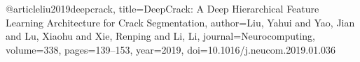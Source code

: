 @article{liu2019deepcrack,
  title={DeepCrack: A Deep Hierarchical Feature Learning Architecture for Crack Segmentation},
  author={Liu, Yahui and Yao, Jian and Lu, Xiaohu and Xie, Renping and Li, Li},
  journal={Neurocomputing},
  volume={338},
  pages={139--153},
  year={2019},
  doi={10.1016/j.neucom.2019.01.036}
}